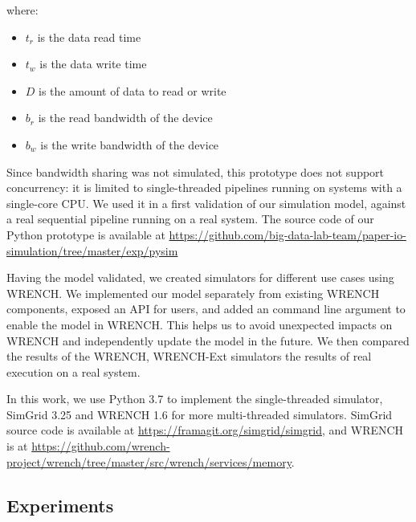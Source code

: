 \documentclass[conference]{IEEEtran}
\begin{document}
			where:
			\begin{itemize}
				\item $t_{r}$ is the data read time
				\item $t_{w}$ is the data write time
				\item $D$ is the amount of data to read or write
				\item $b_r$ is the read bandwidth of the device
				\item $b_w$ is the write bandwidth of the device
			\end{itemize}			

			Since bandwidth sharing was not simulated, this prototype does not support 
			concurrency: it is limited to single-threaded pipelines running on systems 
			with a single-core CPU. We used it in a first validation of our simulation 
			model, against a real sequential pipeline running on a real system.
			The source code of our Python prototype is available at 
			\url{https://github.com/big-data-lab-team/paper-io-simulation/tree/master/exp/pysim}
			
			Having the model validated, we created simulators for different use cases 
			using WRENCH.
			We implemented our model separately from existing WRENCH components, 
			exposed an API for users, and added an command line argument to enable 
			the model in WRENCH. 
			This helps us to avoid unexpected impacts on WRENCH and 
			independently update the model in the future. 
			We then compared the results of the WRENCH, WRENCH-Ext simulators 
			the results of real execution on a real system. 
		
			In this work, we use Python 3.7 to implement the single-threaded simulator, 
			SimGrid 3.25 and WRENCH 1.6 for more multi-threaded simulators. 
			SimGrid source code is available at \url{https://framagit.org/simgrid/simgrid}, 
			and WRENCH is at 
			\url{https://github.com/wrench-project/wrench/tree/master/src/wrench/services/memory}.
			
		\subsection{Experiments}
		
\end{document}
